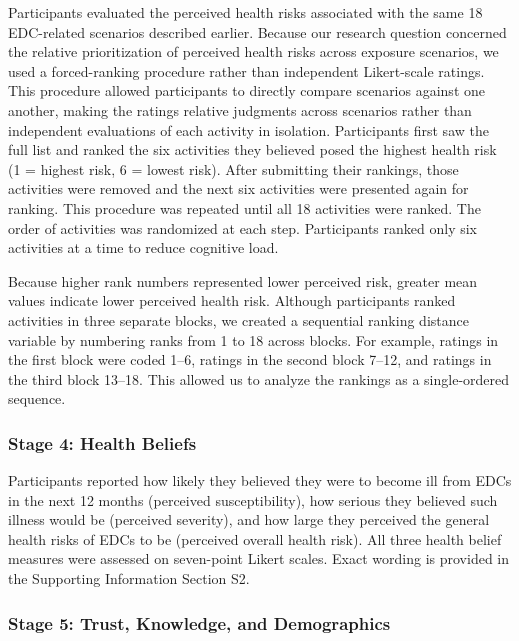 Participants evaluated the perceived health risks associated with the same 18 EDC-related scenarios described earlier. Because our research question concerned the relative prioritization of perceived health risks across exposure scenarios, we used a forced-ranking procedure rather than independent Likert-scale ratings. This procedure allowed participants to directly compare scenarios against one another, making the ratings relative judgments across scenarios rather than independent evaluations of each activity in isolation.
Participants first saw the full list and ranked the six activities they believed posed the highest health risk (1 = highest risk, 6 = lowest risk). After submitting their rankings, those activities were removed and the next six activities were presented again for ranking. This procedure was repeated until all 18 activities were ranked. The order of activities was randomized at each step. Participants ranked only six activities at a time to reduce cognitive load.

Because higher rank numbers represented lower perceived risk, greater mean values indicate lower perceived health risk. Although participants ranked activities in three separate blocks, we created a sequential ranking distance variable by numbering ranks from 1 to 18 across blocks. For example, ratings in the first block were coded 1--6, ratings in the second block 7--12, and ratings in the third block 13--18. This allowed us to analyze the rankings as a single-ordered sequence.

\subsubsection{Stage 4: Health Beliefs}

Participants reported how likely they believed they were to become ill from EDCs in the next 12 months (perceived susceptibility), how serious they believed such illness would be (perceived severity), and how large they perceived the general health risks of EDCs to be (perceived overall health risk). All three health belief measures were assessed on seven-point Likert scales. Exact wording is provided in the Supporting Information Section S2.

\subsubsection{Stage 5: Trust, Knowledge, and Demographics}

